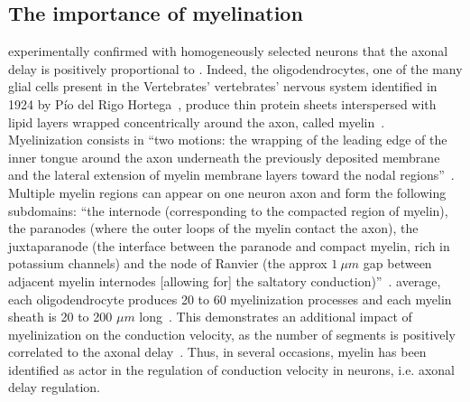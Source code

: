 \documentclass[brainsci, %
               review,submit,pdftex,moreauthors
               ]{Definitions/mdpi}
\begin{document}
\subsection{The importance of myelination}
\citet{gasser_axon_1939} experimentally confirmed with homogeneously selected neurons that the axonal delay is positively proportional to . Indeed, the oligodendrocytes, one of the many glial cells present in the Vertebrates' vertebrates' nervous system identified in 1924 by Pío del Rigo Hortega~\citep{perez-cerda_pio_2015}, produce thin protein sheets interspersed with lipid layers wrapped concentrically around the axon, called myelin~\citep{schmitt_ultrastructure_1939}. Myelinization consists in ``two motions: the wrapping of the leading edge of the inner tongue around the axon underneath the previously deposited membrane and the lateral extension of myelin membrane layers toward the nodal regions''~\citep{simons_oligodendrocytes_2016}. Multiple myelin regions can appear on one neuron axon and form the following subdomains: ``the internode (corresponding to the compacted region of myelin), the paranodes (where the outer loops of the myelin contact the axon), the juxtaparanode (the interface between the paranode and compact myelin, rich in potassium channels) and the node of Ranvier (the approx $1~\mu m$ gap between adjacent myelin internodes [allowing for] the saltatory conduction)''~\citep{duncan_neuron-oligodendrocyte_2021}.  average, each oligodendrocyte produces 20 to 60 myelinization processes and each myelin sheath is 20 to 200 $\mu m$ long~\citep{simons_oligodendrocytes_2016}. This demonstrates an additional impact of myelinization on the conduction velocity, as the number of segments is positively correlated to the axonal delay~\citep{brill_conduction_1977}. Thus, in several occasions, myelin has been identified as  actor in the regulation of conduction velocity in neurons, i.e. axonal delay regulation.
\end{document}
